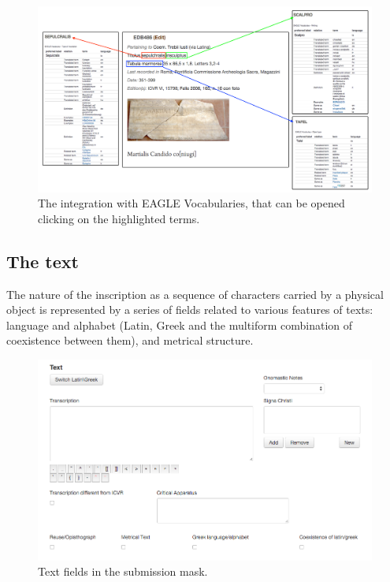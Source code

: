 \documentclass[amsthm,ebook]{saparticle}
\begin{document}
\begin{figure}[hbp]
\centering
 \includegraphics[width=\columnwidth]{EAGLE2016Roccoengrev-img009.png}
\caption{The integration with EAGLE Vocabularies, that can be opened clicking on the highlighted terms.}
\label{fig:9}
\end{figure}




\subsection{The text}


The nature of the inscription as a sequence of characters carried by a physical object is represented by a series of
fields related to various features of texts: language and alphabet (Latin, Greek and the multiform combination of
coexistence between them), and metrical structure.




\begin{figure}[hbp]
\centering
 \includegraphics[width=\columnwidth]{EAGLE2016Roccoengrev-img010.png}
\caption{Text fields in the submission mask.}
\label{fig:10}
\end{figure}
\end{document}
